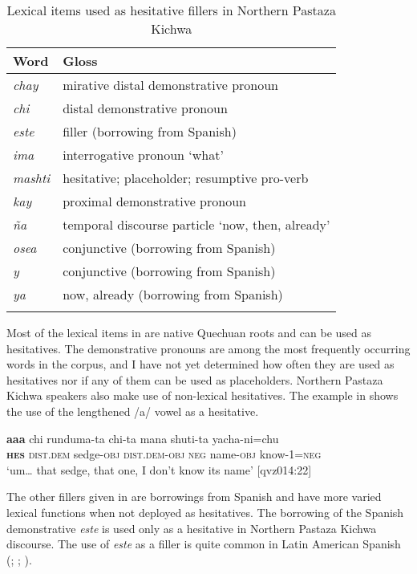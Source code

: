 \documentclass[output=paper]{langscibook}
\begin{document}
\begin{table}
\begin{tabular}{ll}
\lsptoprule
Word & Gloss\\
\midrule
\textit{chay} & mirative distal demonstrative pronoun\\
\textit{chi} & distal demonstrative pronoun\\
\textit{este} & filler (borrowing from Spanish)\\
\textit{ima} & interrogative pronoun ‘what’\\
\textit{mashti} & hesitative; placeholder; resumptive pro-verb\\
\textit{kay} & proximal demonstrative pronoun\\
\textit{ña} & temporal discourse particle ‘now, then, already’\\
\textit{osea} & conjunctive (borrowing from Spanish)\\
\textit{y} & conjunctive (borrowing from Spanish)\\
\textit{ya} & now, already (borrowing from Spanish)\\
\lspbottomrule
\end{tabular}
\caption{\label{tab:rice:1} Lexical items used as hesitative fillers in Northern Pastaza Kichwa}
\end{table}

Most of the lexical items in  are native Quechuan roots and can be used as hesitatives. The demonstrative pronouns are among the most frequently occurring words in the corpus, and I have not yet determined how often they are used as hesitatives nor if any of them can be used as placeholders. Northern Pastaza Kichwa speakers also make use of non-lexical hesitatives. The example in  shows the use of the lengthened /a/ vowel as a hesitative.

\ea%
    \label{ex:rice:1}
    \gll  \textbf{aaa} {chi} {runduma-ta}  {chi-ta} {mana} {shuti-ta} {yacha-ni=chu}\\
    \textbf{\textsc{hes}} \textsc{dist.dem} {sedge-\textsc{obj}} \textsc{dist.dem-obj} \textsc{neg} {name-\textsc{obj}} {know-1=\textsc{neg}}\\
    \glt ‘um… that sedge, that one, I don’t know its name’ [qvz014:22]
\z

The other fillers given in  are borrowings from Spanish and have more varied lexical functions when not deployed as hesitatives. The borrowing of the Spanish demonstrative \textit{este} is used only as a hesitative in Northern Pastaza Kichwa discourse. The use of \textit{este} as a filler is quite common in Latin American Spanish (\citealt{Kany1969}; \citealt{Vallejos-Yopán2023}; \citealt{Zorraquino1999}).
\end{document}
